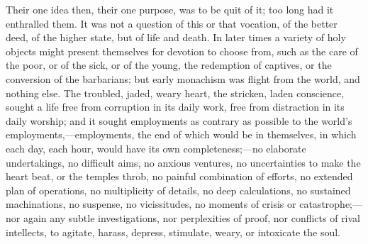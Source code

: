 Their one idea then, their one purpose, was to be quit of it; too
long had it enthralled them. It was not a question of this or that
vocation, of the better deed, of the higher state, but of life and
death. In later times a variety of holy objects might present
themselves for devotion to choose from, such as the care of the poor,
or of the sick, or of the young, the redemption of captives, or the
conversion of the barbarians; but early monachism was flight from the
world, and nothing else. The troubled, jaded, weary heart, the
stricken, laden conscience, sought a life free from corruption in its
daily work, free from distraction in its daily worship; and it sought
employments as contrary as possible to the world's employments,—employments,
the end of which would be in themselves, in which each day, each hour,
would have its own completeness;—no elaborate undertakings, no
difficult aims, no anxious ventures, no uncertainties to make the
heart beat, or the temples throb, no painful combination of efforts,
no extended plan of operations, no multiplicity of details, no deep
calculations, no sustained machinations, no suspense, no vicissitudes,
no moments of crisis or catastrophe;—nor again any subtle
investigations, nor perplexities of proof, nor conflicts of rival
intellects, to agitate, harass, depress, stimulate, weary, or
intoxicate the soul.


